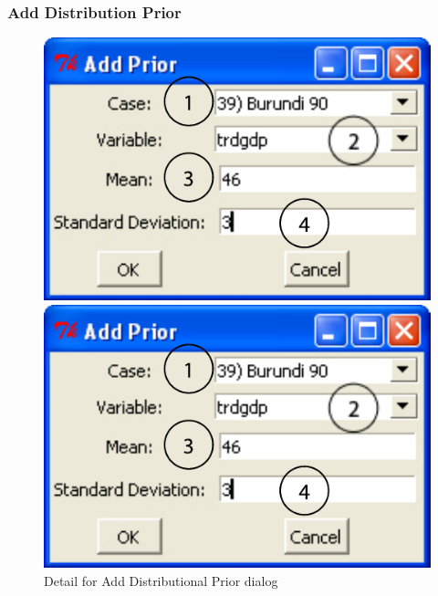 \documentclass[12pt,titlepage]{article}
\begin{document}
\subsubsection{Add Distribution Prior}\label{sec:refdistpri}
\begin{figure}[h]
  \centering
  \begin{htmlonly} 
    \includegraphics[scale=1]{distpri} 
  \end{htmlonly}
  \begin{latexonly}
    \includegraphics[scale=.75]{distpri}
  \end{latexonly}
  \caption{Detail for Add Distributional Prior dialog}
\end{figure}
\end{document}
